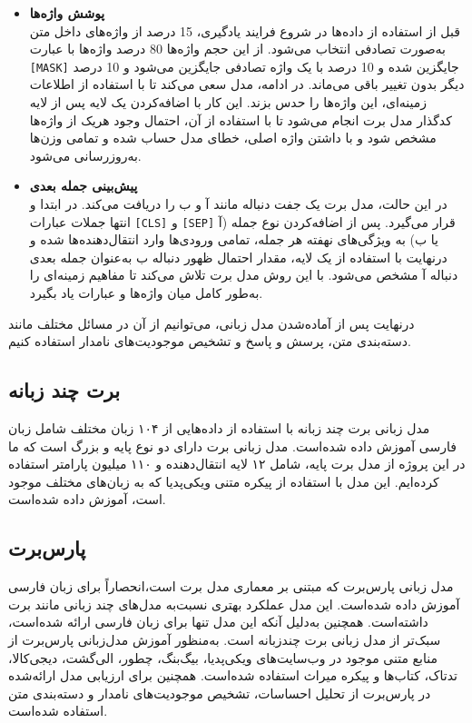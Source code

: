 \begin{itemize}
\item \textbf{پوشش واژه‌ها} \\
قبل از استفاده از داده‌ها در شروع فرایند یادگیری، 15 درصد از واژه‌های داخل متن به‌صورت تصادفی انتخاب می‌شود. 
 از این حجم واژه‌ها 80‌ درصد واژه‌ها با عبارت \verb|[MASK]| جایگزین شده و 10 درصد با یک واژه تصادفی جایگزین می‌شود و 10
 درصد دیگر بدون تغییر باقی می‌ماند. در ادامه، مدل سعی می‌کند تا با استفاده از اطلاعات زمینه‌ای، این واژه‌ها را حدس بزند.
 این کار با اضافه‌کردن یک لایه پس از لایه کدگذار مدل برت انجام می‌شود تا با استفاده از آن، احتمال وجود هریک از واژه‌ها
 مشخص شود و با داشتن واژه اصلی، خطای مدل حساب شده و تمامی وزن‌ها به‌روزرسانی می‌شود.

\item \textbf{پیش‌بینی جمله بعدی} \\
در این حالت، مدل برت یک جفت دنباله مانند آ و ب را دریافت می‌کند. در ابتدا و انتها جملات عبارات \verb|[CLS]| و \verb|[SEP]| قرار
 می‌گیرد. پس از اضافه‌کردن نوع جمله ($آ$ یا $ب$) به ویژگی‌های نهفته هر جمله، تمامی ورودی‌ها وارد انتقال‌دهنده‌ها شده و
 درنهایت با استفاده از یک لایه، مقدار احتمال ظهور دنباله $ب$ به‌عنوان جمله بعدی دنباله $آ$ مشخص می‌شود. با این روش مدل برت
 تلاش می‌کند تا مفاهیم زمینه‌ای را به‌طور کامل میان واژه‌ها و عبارات یاد بگیرد.
\end{itemize}

درنهایت پس از آماده‌شدن مدل زبانی، می‌توانیم از آن در مسائل مختلف مانند دسته‌بندی متن، پرسش و پاسخ و تشخیص
 موجودیت‌های نامدار استفاده کنیم.


\subsection{برت چند زبانه}
	مدل زبانی برت چند زبانه \citep{devlin2018bert} با استفاده از داده‌هایی از ۱۰۴ زبان مختلف شامل زبان فارسی آموزش داده شده‌است. مدل زبانی برت دارای دو نوع پایه و بزرگ است که ما در این پروژه از مدل برت پایه، شامل ۱۲ لایه انتقال‌دهنده و ۱۱۰ میلیون پارامتر استفاده کرده‌ایم. این مدل با استفاده از پیکره متنی ویکی‌پدیا که به زبان‌های مختلف موجود است، آموزش داده شده‌است. 
	
\subsection{پارس‌برت}
	\cite{ParsBERT}
	مدل زبانی پارس‌برت که مبتنی بر معماری مدل برت است،انحصاراً برای زبان فارسی آموزش داده شده‌است. این مدل عملکرد بهتری نسبت‌به مدل‌های چند زبانی مانند برت داشته‌است. همچنین به‌دلیل آنکه این مدل تنها برای زبان فارسی ارائه شده‌است، سبک‌تر از مدل زبانی برت چندزبانه است. به‌منظور آموزش مدل‌زبانی پارس‌برت از منابع متنی موجود در وب‌سایت‌های ویکی‌پدیا، بیگ‌بنگ، چطور، الی‌گشت، دیجی‌کالا، تد‌تاک، کتاب‌ها و پیکره میراث استفاده شده‌است. همچنین برای ارزیابی مدل‌ ارائه‌شده در پارس‌برت از تحلیل احساسات، تشخیص موجودیت‌های نامدار و دسته‌بندی متن استفاده شده‌است.
	

